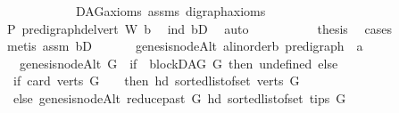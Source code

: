 \begin{isabellebody}
\ \ \ \ \ \ \ \ \ \ \ \ DAG{\isachardot}{\kern0pt}axioms\ assms{\isacharparenleft}{\kern0pt}{}{\isacharparenright}{\kern0pt}\ digraph{\isachardot}{\kern0pt}axioms{\isacharparenright}{\kern0pt}\ \isanewline
\ \ \ \ \ \ \isamarkupfalse%
\ \isamarkupfalse%
\ {\isachardoublequoteopen}P\ {\isacharparenleft}{\kern0pt}pre{\isacharunderscore}{\kern0pt}digraph{\isachardot}{\kern0pt}del{\isacharunderscore}{\kern0pt}vert\ W\ b{\isacharparenright}{\kern0pt}{\isachardoublequoteclose}\ \isamarkupfalse%
\ ind\ bD{}\ \isamarkupfalse%
\ auto\isanewline
\ \ \ \ \isamarkupfalse%
\isanewline
\ \ \ \ \isamarkupfalse%
\ {\isachardoublequoteopen}{\isacharquery}{\kern0pt}thesis{\isachardoublequoteclose}\ \isamarkupfalse%
\ cases{\isacharparenleft}{\kern0pt}{}{\isacharparenright}{\kern0pt}\isanewline
\ \ \ \ \ \ \isamarkupfalse%
\ {\isacharparenleft}{\kern0pt}metis\ assm{}\ bD{\isacharparenright}{\kern0pt}\ \isanewline
\ \ \isamarkupfalse%
\isanewline
{}\isamarkupfalse%
%
\endisatagproof
{\isafoldproof}%
%
\isadelimproof
\ \isanewline
%
\endisadelimproof
\isanewline
{}\isamarkupfalse%
\ genesis{\isacharunderscore}{\kern0pt}nodeAlt{\isacharcolon}{\kern0pt}{\isacharcolon}{\kern0pt}\ {\isachardoublequoteopen}{\isacharparenleft}{\kern0pt}{\isacharprime}{\kern0pt}a{\isacharcolon}{\kern0pt}{\isacharcolon}{\kern0pt}linorder{\isacharcomma}{\kern0pt}{\isacharprime}{\kern0pt}b{\isacharparenright}{\kern0pt}\ pre{\isacharunderscore}{\kern0pt}digraph\ {\isasymRightarrow}\ {\isacharprime}{\kern0pt}a{\isachardoublequoteclose}\isanewline
\ \ \ {\isachardoublequoteopen}genesis{\isacharunderscore}{\kern0pt}nodeAlt\ G\ {\isacharequal}{\kern0pt}\ {\isacharparenleft}{\kern0pt}if\ {\isacharparenleft}{\kern0pt}{\isasymnot}\ blockDAG\ G{\isacharparenright}{\kern0pt}\ then\ undefined\ else\ \isanewline
\ \ if\ {\isacharparenleft}{\kern0pt}card\ {\isacharparenleft}{\kern0pt}verts\ G\ {\isacharparenright}{\kern0pt}\ {\isacharequal}{\kern0pt}\ {}{\isacharparenright}{\kern0pt}\ then\ {\isacharparenleft}{\kern0pt}hd\ {\isacharparenleft}{\kern0pt}sorted{\isacharunderscore}{\kern0pt}list{\isacharunderscore}{\kern0pt}of{\isacharunderscore}{\kern0pt}set\ {\isacharparenleft}{\kern0pt}verts\ G{\isacharparenright}{\kern0pt}{\isacharparenright}{\kern0pt}{\isacharparenright}{\kern0pt}\isanewline
\ \ else\ genesis{\isacharunderscore}{\kern0pt}nodeAlt\ {\isacharparenleft}{\kern0pt}reduce{\isacharunderscore}{\kern0pt}past\ G\ {\isacharparenleft}{\kern0pt}{\isacharparenleft}{\kern0pt}hd\ {\isacharparenleft}{\kern0pt}sorted{\isacharunderscore}{\kern0pt}list{\isacharunderscore}{\kern0pt}of{\isacharunderscore}{\kern0pt}set\ {\isacharparenleft}{\kern0pt}tips\ G{\isacharparenright}{\kern0pt}{\isacharparenright}{\kern0pt}{\isacharparenright}{\kern0pt}{\isacharparenright}{\kern0pt}{\isacharparenright}{\kern0pt}{\isacharparenright}{\kern0pt}{\isachardoublequoteclose}\isanewline

\end{isabellebody}
